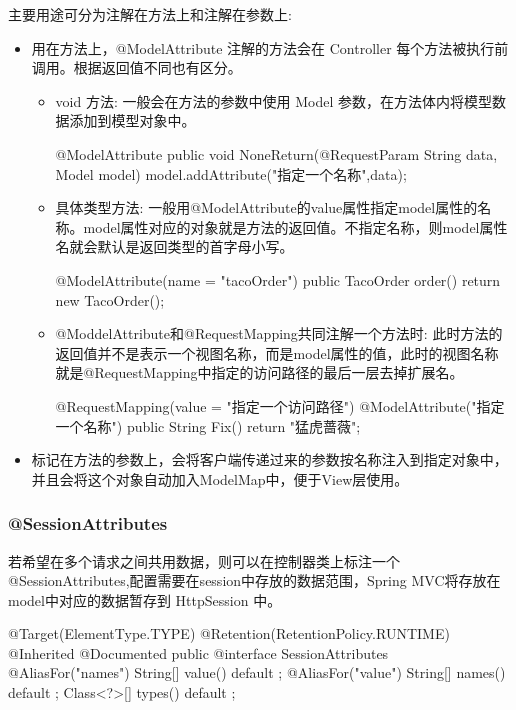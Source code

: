 主要用途可分为注解在方法上和注解在参数上:
\begin{itemize}
    \item 用在方法上，@ModelAttribute 注解的方法会在 Controller 每个方法被执行前调用。根据返回值不同也有区分。
    \begin{itemize}
        \item void 方法: 一般会在方法的参数中使用 Model 参数，在方法体内将模型数据添加到模型对象中。
\begin{Java}
@ModelAttribute 
public void NoneReturn(@RequestParam String data, Model model) { 
    model.addAttribute("指定一个名称",data); 
}
\end{Java}
        \item 具体类型方法: 一般用@ModelAttribute的value属性指定model属性的名称。model属性对应的对象就是方法的返回值。不指定名称，则model属性名就会默认是返回类型的首字母小写。
\begin{Java}
@ModelAttribute(name = "tacoOrder")
public TacoOrder order() {
    return new TacoOrder();
}
\end{Java}
        \item @ModdelAttribute和@RequestMapping共同注解一个方法时: 此时方法的返回值并不是表示一个视图名称，而是model属性的值，此时的视图名称就是@RequestMapping中指定的访问路径的最后一层去掉扩展名。
\begin{Java}
@RequestMapping(value = "指定一个访问路径") 
@ModelAttribute("指定一个名称") 
public String Fix() { 
    return "猛虎蔷薇"; 
} 
\end{Java}
    \end{itemize}
    \item 标记在方法的参数上，会将客户端传递过来的参数按名称注入到指定对象中，并且会将这个对象自动加入ModelMap中，便于View层使用。
\end{itemize}

\subsubsection{@SessionAttributes}

若希望在多个请求之间共用数据，则可以在控制器类上标注一个 @SessionAttributes,配置需要在session中存放的数据范围，Spring MVC将存放在model中对应的数据暂存到 HttpSession 中。

\begin{Java}
@Target({ElementType.TYPE})
@Retention(RetentionPolicy.RUNTIME)
@Inherited
@Documented
public @interface SessionAttributes {
    @AliasFor("names")
    String[] value() default {};
    @AliasFor("value")
    String[] names() default {};
    Class<?>[] types() default {};
}
\end{Java}


\newpage